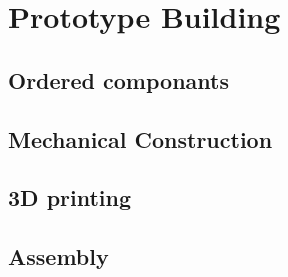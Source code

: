 \chapter{Prototype Building}
\label{sec:protoBuild}

\section{Ordered componants}
\section{Mechanical Construction}
\section{3D printing}
\section{Assembly}
